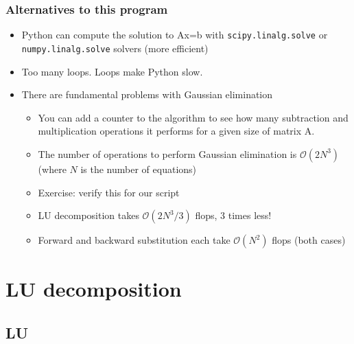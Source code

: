 \begin{frame}[fragile]
  \frametitle{Alternatives to this program}
  \begin{itemize}
    \item Python can compute the solution to Ax=b with \lstinline|scipy.linalg.solve| or \lstinline|numpy.linalg.solve| solvers (more efficient)
    \item Too many loops. Loops make Python slow.
    \item There are fundamental problems with Gaussian elimination\pause
    \begin{itemize}
      \item You can add a counter to the algorithm to see how many subtraction and multiplication operations it performs for a given size of matrix A.
      \item The number of operations to perform Gaussian elimination is $\mathcal{O}(2N^3)$ (where $N$ is the number of equations) 
      \item Exercise: verify this for our script \pause
      \item LU decomposition takes $\mathcal{O}(2N^3/3)$ flops, 3 times less!
      \item Forward and backward substitution each take $\mathcal{O}(N^2)$
flops (both cases) 
    \end{itemize}
  \end{itemize}
\end{frame}

\section{LU decomposition}
\subsection*{LU}

